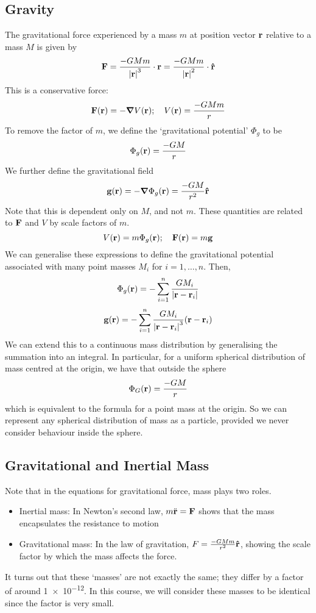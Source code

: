 \subsection{Gravity}
The gravitational force experienced by a mass \(m\) at position vector \(\vb r\) relative to a mass \(M\) is given by
\[
	\vb F = \frac{- G M m}{\abs{\vb r}^3} \cdot \vb r = \frac{- G M m}{\abs{\vb r}^2} \cdot \vu{r}
\]
This is a conservative force:
\[
	\vb F(\vb r) = -\grad V(\vb r);\quad V(\vb r) = \frac{-GMm}{r}
\]
To remove the factor of \(m\), we define the `gravitational potential' \(\Phi_g\) to be
\[
	\Phi_g(\vb r) = \frac{-GM}{r}
\]
We further define the gravitational field
\[
	\vb g(\vb r) = -\grad \Phi_g(\vb r) = \frac{-GM}{r^2}\vu{r}
\]
Note that this is dependent only on \(M\), and not \(m\).
These quantities are related to \(\vb F\) and \(V\) by scale factors of \(m\).
\[
	V(\vb r) = m \Phi_g(\vb r);\quad \vb F(\vb r) = m\vb g
\]
We can generalise these expressions to define the gravitational potential associated with many point masses \(M_i\) for \(i = 1, \dots, n\).
Then,
\[
	\Phi_g(\vb r) = -\sum_{i=1}^n \frac{GM_i}{\abs{\vb r - \vb r_i}}
\]
\[
	\vb g(\vb r) = -\sum_{i=1}^n \frac{GM_i}{\abs{\vb r - \vb r_i}^3}(\vb r - \vb r_i)
\]
We can extend this to a continuous mass distribution by generalising the summation into an integral.
In particular, for a uniform spherical distribution of mass centred at the origin, we have that outside the sphere
\[
	\Phi_G(\vb r) = \frac{-GM}{r}
\]
which is equivalent to the formula for a point mass at the origin.
So we can represent any spherical distribution of mass as a particle, provided we never consider behaviour inside the sphere.

\subsection{Gravitational and Inertial Mass}
Note that in the equations for gravitational force, mass plays two roles.
\begin{itemize}
	\item Inertial mass: In Newton's second law, \(m \ddot{\vb r} = \vb F\) shows that the mass encapsulates the resistance to motion
	\item Gravitational mass: In the law of gravitation, \(F = \frac{-GMm}{r^2}\vu{r}\), showing the scale factor by which the mass affects the force.
\end{itemize}
It turns out that these `masses' are not exactly the same; they differ by a factor of around \num{1e-12}.
In this course, we will consider these masses to be identical since the factor is very small.

